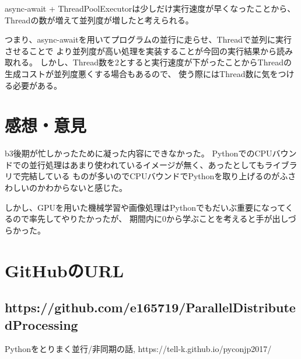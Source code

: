 \documentclass[14pt, oneside]{article}     	%
\begin{document}
async-await + ThreadPoolExecutorは少しだけ実行速度が早くなったことから、
Threadの数が増えて並列度が増したと考えられる。

つまり、async-awaitを用いてプログラムの並行に走らせ、Threadで並列に実行させることで
より並列度が高い処理を実装することが今回の実行結果から読み取れる。
しかし、Thread数を2とすると実行速度が下がったことからThreadの生成コストが並列度悪くする場合もあるので、
使う際にはThread数に気をつける必要がある。

\section{感想・意見}
b3後期が忙しかったために凝った内容にできなかった。
PythonでのCPUバウンドでの並行処理はあまり使われているイメージが無く、あったとしてもライブラリで完結している
ものが多いのでCPUバウンドでPythonを取り上げるのがふさわしいのかわからないと感じた。

しかし、GPUを用いた機械学習や画像処理はPythonでもだいぶ重要になってくるので率先してやりたかったが、
期間内に0から学ぶことを考えると手が出しづらかった。
\section{GitHubのURL}
\subsection*{https://github.com/e165719/ParallelDistributedProcessing}
\begin{thebibliography}{9}
   Pythonをとりまく並行/非同期の話,  https://tell-k.github.io/pyconjp2017/
\end{thebibliography}
\end{document}
